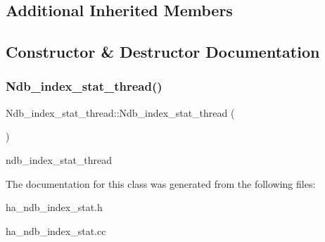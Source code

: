 \subsection*{Additional Inherited Members}


\subsection{Constructor \& Destructor Documentation}
\mbox{\label{classNdb__index__stat__thread_a1990049af05cd9ffa1c75526ac20bbb4}} 
\subsubsection{\texorpdfstring{Ndb\+\_\+index\+\_\+stat\+\_\+thread()}{Ndb\_index\_stat\_thread()}}
{\footnotesize\ttfamily Ndb\+\_\+index\+\_\+stat\+\_\+thread\+::\+Ndb\+\_\+index\+\_\+stat\+\_\+thread (\begin{DoxyParamCaption}{ }\end{DoxyParamCaption})}

ndb\+\_\+index\+\_\+stat\+\_\+thread 

The documentation for this class was generated from the following files\+:\begin{DoxyCompactItemize}
\item 
ha\+\_\+ndb\+\_\+index\+\_\+stat.\+h\item 
ha\+\_\+ndb\+\_\+index\+\_\+stat.\+cc\end{DoxyCompactItemize}
